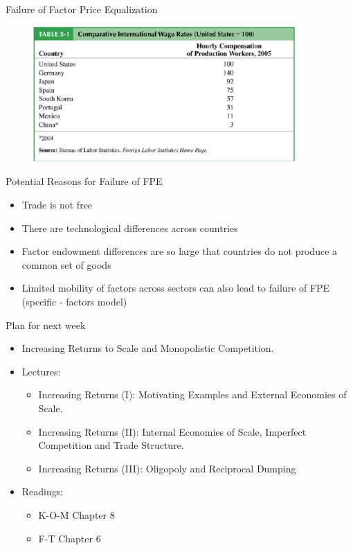\documentclass[10pt,hyperref={CJKbookmarks=true},xcolor=dvipsnames,aspectratio=169]{beamer}
\begin{document}
\begin{frame}{Failure of Factor Price Equalization}


\begin{figure}


\begin{centering}
\includegraphics[width=10cm]{fig/ho/lec5-21}
\par\end{centering}

\end{figure}



\end{frame}

\begin{frame}{Potential Reasons for Failure of FPE}

\begin{itemize}
\item Trade is not free 
\item There are technological differences across countries 
\item Factor endowment differences are so large that countries do not produce
a common set of goods 
\item Limited mobility of factors across sectors can also lead to failure
of FPE (specific - factors model) 
\end{itemize}
\end{frame}

\begin{frame}{Plan for next week}

\begin{itemize}
\item Increasing Returns to Scale and Monopolistic Competition. 
\item Lectures: 

\begin{itemize}
\item Increasing Returns (I): Motivating Examples and External Economies
of Scale. 
\item Increasing Returns (II): Internal Economies of Scale, Imperfect Competition
and Trade Structure. 
\item Increasing Returns (III): Oligopoly and Reciprocal Dumping 
\end{itemize}
\item Readings: 

\begin{itemize}
\item K-O-M Chapter 8 
\item F-T Chapter 6
\end{itemize}
\end{itemize}
\end{frame}
\end{document}
